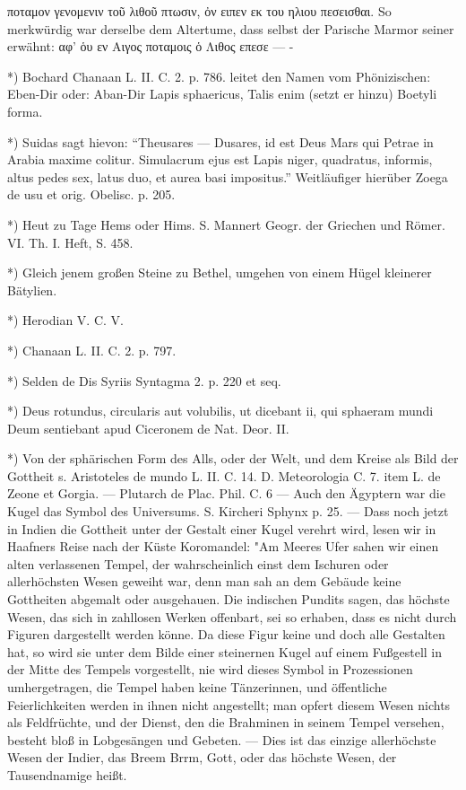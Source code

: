 \documentclass[a4paper, 11pt, oneside, polutonikogreek, german]{article}
\begin{document}
ποταμον γενομενιν τοῦ λιθοῦ πτωσιν, ὀν ειπεν εκ του ηλιου πεσεισθαι. So merkwürdig war derselbe dem Altertume, dass selbst der Parische Marmor seiner erwähnt:
αφ' ὁυ εν Αιγος ποταμοις
ὁ Λιθος επεσε --- -

*) Bochard Chanaan L. II. C. 2. p. 786. leitet den Namen vom Phönizischen: Eben-Dir oder: Aban-Dir Lapis sphaericus, Talis enim (setzt er hinzu) Boetyli forma.

*) Suidas sagt hievon: "`Theusares --- Dusares, id est Deus Mars qui Petrae in Arabia maxime colitur. Simulacrum ejus est Lapis niger, quadratus, informis, altus pedes sex, latus duo, et aurea basi impositus."' Weitläufiger hierüber Zoega de usu et orig. Obelisc. p. 205.

*) Heut zu Tage Hems oder Hims. S. Mannert Geogr. der Griechen und Römer. VI. Th. I. Heft, S. 458.

*) Gleich jenem großen Steine zu Bethel, umgehen von einem Hügel kleinerer Bätylien.

*) Herodian V. C. V.

*) Chanaan L. II. C. 2. p. 797.

*) Selden de Dis Syriis Syntagma 2. p. 220 et seq.

*) Deus rotundus, circularis aut volubilis, ut dicebant ii, qui sphaeram mundi Deum sentiebant apud Ciceronem de Nat. Deor. II.

*) Von der sphärischen Form des Alls, oder der Welt, und dem Kreise als Bild der Gottheit s. Aristoteles de mundo L. II. C. 14. D. Meteorologia C. 7. item L. de Zeone et Gorgia. --- Plutarch de Plac. Phil. C. 6 --- Auch den Ägyptern war die Kugel das Symbol des Universums. S. Kircheri Sphynx p. 25. --- Dass noch jetzt in Indien die Gottheit unter der Gestalt einer Kugel verehrt wird, lesen wir in Haafners Reise nach der Küste Koromandel:
"Am Meeres Ufer sahen wir einen alten verlassenen Tempel, der wahrscheinlich einst dem Ischuren oder allerhöchsten Wesen geweiht war, denn man sah an dem Gebäude keine Gottheiten abgemalt oder ausgehauen. Die indischen Pundits sagen, das höchste Wesen, das sich in zahllosen Werken offenbart, sei so erhaben, dass es nicht durch Figuren dargestellt werden könne. Da diese Figur keine und doch alle Gestalten hat, so wird sie unter dem Bilde einer steinernen Kugel auf einem Fußgestell in der Mitte des Tempels vorgestellt, nie wird dieses Symbol in Prozessionen umhergetragen, die Tempel haben keine Tänzerinnen, und öffentliche Feierlichkeiten werden in ihnen nicht angestellt; man opfert diesem Wesen nichts als Feldfrüchte, und der Dienst, den die Brahminen in seinem Tempel versehen, besteht bloß in Lobgesängen und Gebeten. --- Dies ist das einzige allerhöchste Wesen der Indier, das Breem Brrm, Gott, oder das höchste Wesen, der Tausendnamige heißt.
\end{document}
